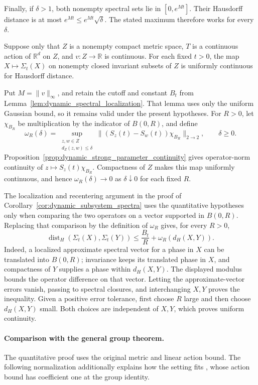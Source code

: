 Finally, if $\delta>1$, both nonempty spectral sets lie in $[0,e^{Mt}]$.
Their Hausdorff distance is at most $e^{Mt}\leq e^{Mt}\sqrt\delta$.
The stated maximum therefore works for every $\delta$.
\Done

\begin{corollary}
\label{cor:dynamic_subsystem_spectra_continuous}
Suppose only that $Z$ is a nonempty compact metric space, $T$ is a
continuous action of $\mathbb R^d$ on $Z$, and $v:Z\to\mathbb R$ is
continuous. For each fixed $t>0$, the map
$X\mapsto\Sigma_t(X)$ on nonempty closed invariant subsets of $Z$
is uniformly continuous for Hausdorff distance.
\end{corollary}
\Proof
Put $M=\|v\|_\infty$, and retain the cutoff and constant $B_t$ from
Lemma~\ref{lem:dynamic_spectral_localization}. That lemma uses only the
uniform Gaussian bound, so it remains valid under the present
hypotheses. For $R>0$, let $\chi_{B_R}$ be multiplication by the
indicator of $B(0,R)$, and define
\[
\omega_R(\delta)=\sup_{\substack{z,w\in Z\\d_Z(z,w)\leq\delta}}
 \|(S_z(t)-S_w(t))\chi_{B_R}\|_{2\to2},\qquad \delta\geq0.
\]
Proposition~\ref{prop:dynamic_strong_parameter_continuity} gives
operator-norm continuity of $z\mapsto S_z(t)\chi_{B_R}$.
Compactness of $Z$ makes this map uniformly continuous, and hence
$\omega_R(\delta)\to0$ as $\delta\downarrow0$ for each fixed $R$.

The localization and recentering argument in the proof of
Corollary~\ref{cor:dynamic_subsystem_spectra} uses the quantitative
hypotheses only when comparing the two operators on a vector supported
in $B(0,R)$. Replacing that comparison by the definition of
$\omega_R$ gives, for every $R>0$,
\[
\operatorname{dist}_H(\Sigma_t(X),\Sigma_t(Y))
 \leq \frac{B_t}{R}+\omega_R(d_H(X,Y)).
\]
Indeed, a localized approximate spectral vector for a phase in $X$
can be translated into $B(0,R)$; invariance keeps its translated phase
in $X$, and compactness of $Y$ supplies a phase within $d_H(X,Y)$.
The displayed modulus bounds the operator difference on that vector.
Letting the approximate-vector errors vanish, passing to spectral
closures, and interchanging $X,Y$ proves the inequality.
Given a positive error tolerance, first choose $R$ large and then
choose $d_H(X,Y)$ small. Both choices are independent of $X,Y$,
which proves uniform continuity.
\Done

\paragraph{Comparison with the general group theorem.}
The quantitative proof uses the original metric and linear action bound.
The following normalization additionally explains how the setting fits
\textcite[Theorem~1.3(a)]{BeckusTakase2025Spectral}, whose action bound
has coefficient one at the group identity.


